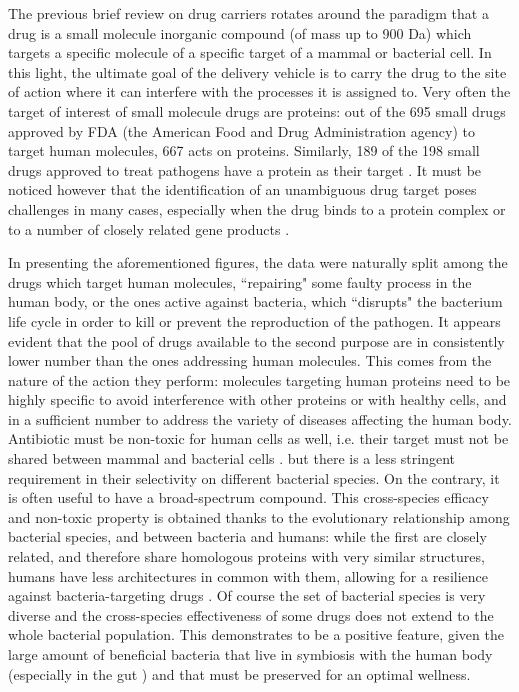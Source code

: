 The previous brief review on drug carriers rotates around the paradigm that a drug is a small molecule inorganic compound (of mass up to 900 Da) which targets a specific molecule of a specific target of a mammal or bacterial cell. In this light, the ultimate goal of the delivery vehicle is to carry the drug to the site of action where it can interfere with the processes it is assigned to. Very often the target of interest of small molecule drugs are proteins: out of the 695 small drugs approved by FDA (the American Food and Drug Administration agency) to target human molecules, 667 acts on proteins. Similarly, 189 of the 198 small drugs approved to treat pathogens have a protein as their target \cite{Santos2017}.
%
It must be noticed however that the identification of an unambiguous drug target poses challenges in many cases, especially when the drug binds to a protein complex or to a number of closely related gene products \cite{Santos2017}.

In presenting the aforementioned figures, the data were naturally split among the drugs which target human molecules, ``repairing" some faulty process in the human body, or the ones active against bacteria, which ``disrupts" the bacterium life cycle in order to kill or prevent the reproduction of the pathogen.
%
It appears evident that the pool of drugs available to the second purpose are in consistently lower number than the ones addressing human molecules. This comes from the nature of the action they perform: molecules targeting human proteins need to be highly specific to avoid interference with other proteins or with healthy cells, and in a sufficient number to address the variety of diseases affecting the human body.
%
Antibiotic must be non-toxic for human cells as well, i.e. their target must not be shared between mammal and bacterial cells \cite{???}. but there is a less stringent requirement in their selectivity on different bacterial species. On the contrary, it is often useful to have a broad-spectrum compound. This cross-species efficacy and non-toxic property is obtained thanks to the evolutionary relationship among bacterial species, and between bacteria and humans: while the first are closely related, and therefore share homologous proteins with very similar structures, humans have less architectures in common with them, allowing for a resilience against bacteria-targeting drugs \cite{???}.
%
Of course the set of bacterial species is very diverse and the cross-species effectiveness of some drugs does not extend to the whole bacterial population. This demonstrates to be a positive feature, given the large amount of beneficial bacteria that live in symbiosis with the human body (especially in the gut \cite{???}) and that must be preserved for an optimal wellness.

